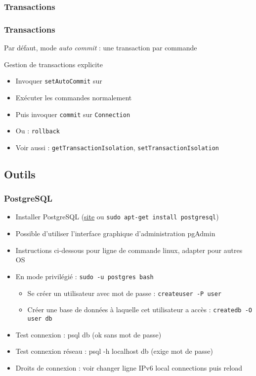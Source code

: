\documentclass[english, french]{beamer}
\begin{document}
\subsubsection{Transactions}
\begin{frame}
	\frametitle{Transactions}
	Par défaut, mode \emph{auto commit} : une transaction par commande
	\begin{block}{Gestion de transactions explicite}
		\begin{itemize}
			\item Invoquer \texttt{setAutoCommit} sur 
			\item Exécuter les commandes normalement
			\item Puis invoquer \texttt{commit} sur \texttt{Connection}
			\item Ou : \texttt{rollback}
			\item Voir aussi : \texttt{getTransactionIsolation}, \texttt{setTransactionIsolation}
		\end{itemize}
	\end{block}
\end{frame}

\subsection{Outils}
\begin{frame}
	\frametitle{PostgreSQL}
	\begin{itemize}
		\item Installer PostgreSQL (\href{http://www.postgresql.org/}{site} {\tiny ou \texttt{sudo apt-get install postgresql}})
		\item Possible d’utiliser l’interface graphique d’administration pgAdmin
		\item Instructions ci-dessous pour ligne de commande linux, adapter pour autres OS
		\item En mode privilégié : \texttt{sudo -u postgres bash}
		\begin{itemize}
			\item Se créer un utilisateur avec mot de passe : \texttt{createuser -P user}
			\item Créer une base de données à laquelle cet utilisateur a accès : \texttt{createdb -O user db}
		\end{itemize}
		\item Test connexion : psql db (ok sans mot de passe)
		\item Test connexion réseau : psql -h localhost db (exige mot de passe)
		\item Droits de connexion : voir   {\tiny changer ligne IPv6 local connections puis reload}
	\end{itemize}
\end{frame}
\end{document}
